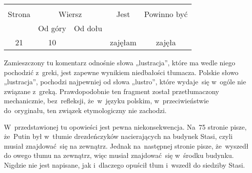 \documentclass[a4paper,11pt]{article}
\begin{document}


\begin{center}

  \begin{tabular}{|c|c|c|c|c|}
    \hline
    & \multicolumn{2}{c|}{} & & \\
    Strona & \multicolumn{2}{c|}{Wiersz} & Jest
                              & Powinno być \\ \cline{2-3}
    & Od góry & Od dołu & & \\
    \hline
    21 & 10 & & zajęłam & zajęła \\
    \hline
  \end{tabular}

\end{center}

\vspace{\spaceTwo}














\start {} Zamieszczony tu komentarz odnośnie słowa
„lustracja”, które ma wedle niego pochodzić z~greki, jest zapewne
wynikiem niedbałości tłumacza. Polskie słowo „lustracja”, pochodzi
najpewniej od słowa „lustro”, które wydaje~się w~ogóle nie związane
z~greką. Prawdopodobnie ten fragment został przetłumaczony
mechanicznie, bez~refleksji, że~w~języku polskim, w~przeciwieństwie
do~oryginału, ten związek etymologiczny nie zachodzi.

\vspace{\spaceFour}



\start {} W~przedstawionej tu opowieści jest pewna
niekonsekwencja. Na~75 stronie pisze, że~Putin był w~tłumie
drezdeńczyków nacierających na budynek Stasi, czyli musiał
znajdować~się na zewnątrz. Jednak na~następnej stronie pisze,
że~wyszedł do owego tłumu na zewnątrz, więc musiał znajdować~się
w~środku budynku. Nigdzie nie jest napisane, jak i~dlaczego opuścił
tłum i~wszedł do siedziby Stasi.
\end{document}
